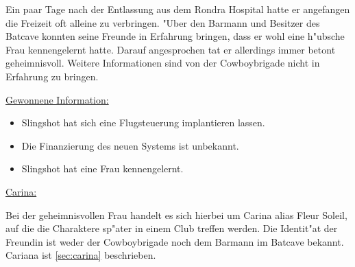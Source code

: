 Ein paar Tage nach der Entlassung aus dem Rondra Hospital hatte er angefangen die Freizeit oft alleine zu verbringen. "Uber den Barmann und Besitzer des Batcave konnten seine Freunde in Erfahrung bringen, dass er wohl eine h"ubsche Frau kennengelernt hatte. Darauf angesprochen tat er allerdings immer betont geheimnisvoll. Weitere Informationen sind von der Cowboybrigade nicht in Erfahrung zu bringen.

\begin{remarks}
	\underline{Gewonnene Information:}

	\begin{itemize}
		\item Slingshot hat sich eine Flugsteuerung implantieren lassen.
		\item Die Finanzierung des neuen Systems ist unbekannt.
		\item Slingshot hat eine Frau kennengelernt.
	\end{itemize}

	\underline{Carina:}
	
	Bei der geheimnisvollen Frau handelt es sich hierbei um Carina alias Fleur Soleil, auf die die Charaktere sp"ater in einem Club treffen werden. Die Identit"at der Freundin ist weder der Cowboybrigade noch dem Barmann im Batcave bekannt. Cariana ist \cref{sec:carina} beschrieben.
\end{remarks}

